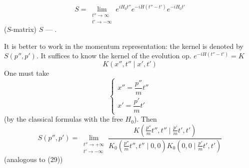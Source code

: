 \begin{equation*}
S=\lim_{\substack{t''\to\infty\\t'\to-\infty}}
e^{iH_0t''}e^{-iH(t''-t')}e^{-iH_0t'}
\tag{29}
\end{equation*}
(\(S\)-matrix)  \(S\) --- .

It is better to work in the momentum representation: the kernel is denoted by \(S(p'',p')\). It suffices to know the kernel of the evolution op.
\(e^{-iH(t''-t')}=K\)
\[
K(x'',t''\mid x',t')
\]
One must take
\begin{equation*}
\begin{cases}
x''=\dfrac{p''}{m}t''\\
x'=\dfrac{p'}{m}t'
\end{cases}
\tag{30}
\end{equation*}
(by the classical formulas with the free \(H_0\)). Then
\begin{equation*}
S(p'',p')=\lim_{\substack{t''\to+\infty\\t'\to-\infty}}
\frac{K\left(\frac{p''}{m}t'',t''\mid\frac{p'}{m}t',t'\right)}
{K_0\left(\frac{p''}{m}t'',t''\mid0,0\right)
K_0\left(0,0\mid\frac{p'}{m}t',t'\right)}
\tag{31}
\end{equation*}
(analogous to (29))


